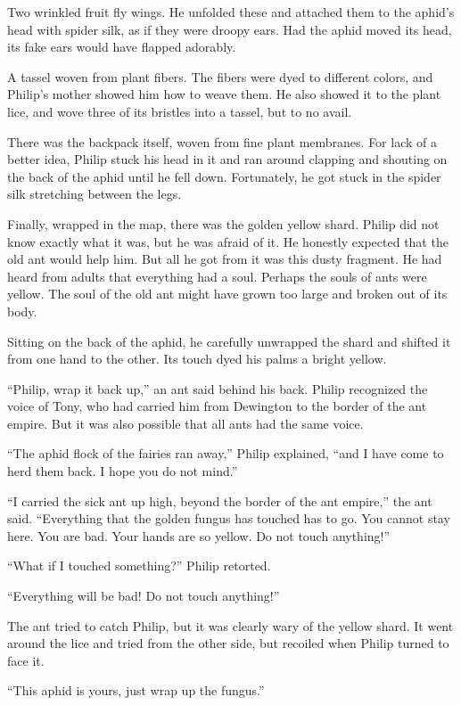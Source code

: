 \documentclass[10pt]{memoir}
\begin{document}
Two wrinkled fruit fly wings. He unfolded these and attached them to the
aphid's head with spider silk, as if they were droopy ears. Had the aphid moved
its head, its fake ears would have flapped adorably.

A tassel woven from plant fibers. The fibers were dyed to different colors, and
Philip's mother showed him how to weave them. He also showed it to the plant
lice, and wove three of its bristles into a tassel, but to no avail.

There was the backpack itself, woven from fine plant membranes. For lack of a
better idea, Philip stuck his head in it and ran around clapping and shouting
on the back of the aphid until he fell down. Fortunately, he got stuck in the
spider silk stretching between the legs.

Finally, wrapped in the map, there was the golden yellow shard. Philip did not
know exactly what it was, but he was afraid of it. He honestly expected that
the old ant would help him. But all he got from it was this dusty fragment. He
had heard from adults that everything had a soul. Perhaps the souls of ants
were yellow. The soul of the old ant might have grown too large and broken out
of its body.

Sitting on the back of the aphid, he carefully unwrapped the shard and shifted
it from one hand to the other. Its touch dyed his palms a bright yellow.

``Philip, wrap it back up,'' an ant said behind his back. Philip recognized the
voice of Tony, who had carried him from Dewington to the border of the ant
empire. But it was also possible that all ants had the same voice.

``The aphid flock of the fairies ran away,'' Philip explained, ``and I have
come to herd them back. I hope you do not mind.''

``I carried the sick ant up high, beyond the border of the ant empire,'' the
ant said. ``Everything that the golden fungus has touched has to go. You cannot
stay here. You are bad. Your hands are so yellow. Do not touch anything!''

``What if I touched something?'' Philip retorted.

``Everything will be bad! Do not touch anything!''

The ant tried to catch Philip, but it was clearly wary of the yellow shard. It
went around the lice and tried from the other side, but recoiled when Philip
turned to face it.

``This aphid is yours, just wrap up the fungus.''
\end{document}
